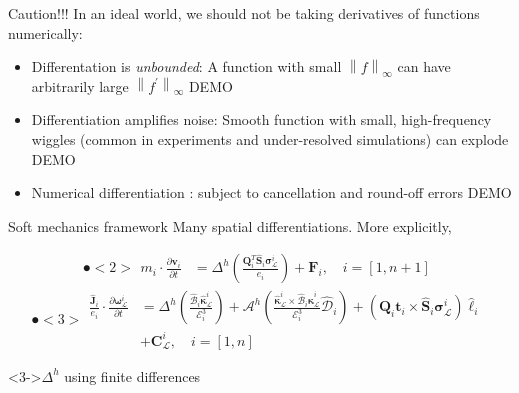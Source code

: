 \documentclass[presentation]{beamer}
\newcommand{\norm}[1]{\left\lVert#1\right\rVert}
\begin{document}
\begin{frame}[label={sec:orgfc2b6ab}]{Caution!!!}
In an ideal world, we should not be taking derivatives of functions
numerically:
\begin{itemize}
\item Differentation is \emph{unbounded}:
A function with small \(\norm{f}_{\infty}\) can have arbitrarily large \(\norm{f^{\prime}}_{\infty}\) \alert{DEMO}
\item Differentiation amplifies noise:
Smooth function with small, high-frequency wiggles (common in experiments
and under-resolved simulations) can explode \alert{DEMO}
\item Numerical differentiation : subject to cancellation and round-off errors \alert{DEMO}
\end{itemize}
\end{frame}
\begin{frame}[label={sec:org1cef3c7}]{Soft mechanics framework}
Many spatial differentiations. More explicitly,

\[ \spot<2>{\begin{aligned}
   m_i \cdot \frac{\partial \mathbf{v}_i}{\partial t} &= \Delta^h
   \left(\frac{\mathbf{Q}_i^T\hat{\mathbf{S}}_i\boldsymbol{\sigma}^i_{\mathcal{L}}}{e_i}\right)
   +\mathbf{F}_i,\quad i=[1,n+1]
   \end{aligned}} \]
\[ \spot<3>{\begin{aligned}\frac{\hat{\mathbf{J}}_i}{e_i} \cdot \frac{\partial
	\boldsymbol{\omega}^i_{\mathcal{L}}}{\partial t} &=
	\Delta^h\left(\frac{\hat{\boldsymbol{\mathcal{B}}}_i\hat{\boldsymbol{\kappa}}_{\mathcal{L}}^{i}}{\mathcal{E}_i^3}\right) +
	\mathcal{A}^h\left(\frac{\hat{\boldsymbol{\kappa}}_{\mathcal{L}}^i\times\hat{\boldsymbol{\mathcal{B}}}_i
	\hat{\boldsymbol{\kappa}}_{\mathcal{L}}^i}{\mathcal{E}_i^3}
	\hat{\mathcal{D}}_i\right) + \left(\mathbf{Q}_i\mathbf{t}_i\times\hat{\mathbf{S}}_i\boldsymbol{\sigma}^i_{\mathcal{L}}\right)\hat{\ell}_i\\
	&+ \mathbf{C}^i_{\mathcal{L}},\quad i=[1,n] \end{aligned}}\]
\begin{block}<3->{\(\Delta^{h}\) using finite differences}
\end{block}
\end{frame}
\end{document}
